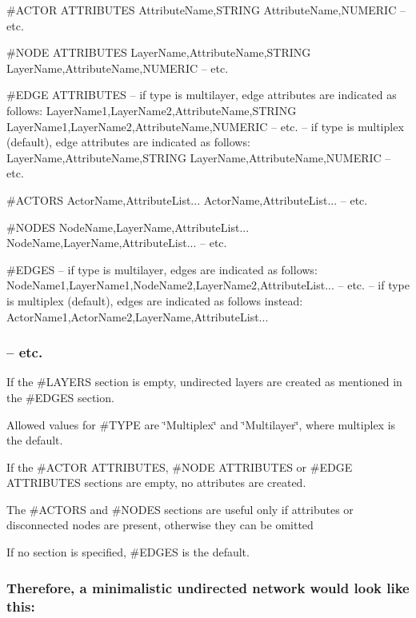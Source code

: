 \#\+A\+C\+T\+O\+R A\+T\+T\+R\+I\+B\+U\+T\+E\+S Attribute\+Name,S\+T\+R\+I\+N\+G Attribute\+Name,N\+U\+M\+E\+R\+I\+C -- etc.

\#\+N\+O\+D\+E A\+T\+T\+R\+I\+B\+U\+T\+E\+S Layer\+Name,Attribute\+Name,S\+T\+R\+I\+N\+G Layer\+Name,Attribute\+Name,N\+U\+M\+E\+R\+I\+C -- etc.

\#\+E\+D\+G\+E A\+T\+T\+R\+I\+B\+U\+T\+E\+S -- if type is multilayer, edge attributes are indicated as follows\+: Layer\+Name1,Layer\+Name2,Attribute\+Name,S\+T\+R\+I\+N\+G Layer\+Name1,Layer\+Name2,Attribute\+Name,N\+U\+M\+E\+R\+I\+C -- etc. -- if type is multiplex (default), edge attributes are indicated as follows\+: Layer\+Name,Attribute\+Name,S\+T\+R\+I\+N\+G Layer\+Name,Attribute\+Name,N\+U\+M\+E\+R\+I\+C -- etc.

\#\+A\+C\+T\+O\+R\+S Actor\+Name,Attribute\+List... Actor\+Name,Attribute\+List... -- etc.

\#\+N\+O\+D\+E\+S Node\+Name,Layer\+Name,Attribute\+List... Node\+Name,Layer\+Name,Attribute\+List... -- etc.

\#\+E\+D\+G\+E\+S -- if type is multilayer, edges are indicated as follows\+: Node\+Name1,Layer\+Name1,Node\+Name2,Layer\+Name2,Attribute\+List... -- etc. -- if type is multiplex (default), edges are indicated as follows instead\+: Actor\+Name1,Actor\+Name2,Layer\+Name,Attribute\+List... \subsubsection*{-- etc. }

If the \#\+L\+A\+Y\+E\+R\+S section is empty, undirected layers are created as mentioned in the \#\+E\+D\+G\+E\+S section.

Allowed values for \#\+T\+Y\+P\+E are \char`\"{}\+Multiplex\char`\"{} and \char`\"{}\+Multilayer\char`\"{}, where multiplex is the default.

If the \#\+A\+C\+T\+O\+R A\+T\+T\+R\+I\+B\+U\+T\+E\+S, \#\+N\+O\+D\+E A\+T\+T\+R\+I\+B\+U\+T\+E\+S or \#\+E\+D\+G\+E A\+T\+T\+R\+I\+B\+U\+T\+E\+S sections are empty, no attributes are created.

The \#\+A\+C\+T\+O\+R\+S and \#\+N\+O\+D\+E\+S sections are useful only if attributes or disconnected nodes are present, otherwise they can be omitted

If no section is specified, \#\+E\+D\+G\+E\+S is the default.

\subsubsection*{Therefore, a minimalistic undirected network would look like this\+: }

